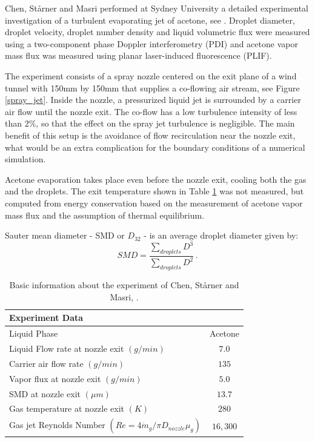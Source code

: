 
Chen, St\aa{}rner and Masri performed at Sydney University a detailed experimental investigation of a turbulent evaporating jet of acetone, see \cite{chen}. Droplet diameter, droplet velocity, droplet number density and liquid volumetric flux were measured using a two-component phase Doppler interferometry (PDI) and acetone vapor mass flux was measured using planar laser-induced fluorescence (PLIF).

The experiment consists of a spray nozzle centered on the exit plane of a wind tunnel with 150mm by 150mm that supplies a co-flowing air stream, see Figure \ref{spray_jet}. 
Inside the nozzle, a pressurized liquid jet is surrounded by a carrier air flow until the nozzle exit. The co-flow has a low turbulence intensity of less than $2\%$, so that the effect on the spray jet turbulence is negligible. The main benefit of this setup is the avoidance of flow recirculation near the nozzle exit, what would be an extra complication for the boundary conditions of a numerical simulation.

Acetone evaporation takes place even before the nozzle exit, cooling both the gas and the droplets. The exit temperature shown in Table \ref{table: experiment} was not measured, but computed from energy conservation based on the measurement of acetone vapor mass flux and  the assumption of thermal equilibrium.

\begin{notation}
Sauter mean diameter - SMD or $D_{32}$ - is an average droplet diameter given by:
\begin{equation}
 SMD= \frac{\sum_{droplets} D^3}{\sum_{droplets} D^2} \, .
\end{equation}
\end{notation}

\begin{table}
\centering
 \begin{tabular}{lc}
\hline
Experiment  Data & \\ \hline
Liquid Phase & Acetone \\
Liquid Flow rate at nozzle exit $(g/min)$  &  $7.0$ \\
Carrier air flow rate $(g/min)$ & $135$ \\
Vapor flux at nozzle exit $(g/min)$ & $5.0$ \\
SMD at nozzle exit $(\mu m)$ & $13.7$ \\
Gas temperature at nozzle exit $(K)$ & $280$ \\ 
Gas jet Reynolds Number $(Re=4 \dot{m}_g/\pi D_{nozzle} \mu_g)$ & $16,300$ \\
\hline
 \end{tabular}
\caption{Basic information about the experiment of Chen, St\aa{}rner and Masri, \cite{chen}.}
\label{table: experiment}
\end{table} 


